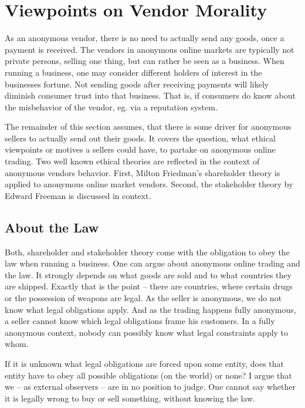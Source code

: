 \section{Viewpoints on Vendor Morality}
\label{vendors}

As an anonymous vendor, there is no need to actually send any goods, once a payment is received. The vendors in anonymous online markets are typically not private persons, selling one thing, but can rather be seen as a business\cite{silkroad2013}. When running a business, one may consider different holders of interest in the businesses fortune. Not sending goods after receiving payments will likely diminish consumer trust into that business. That is, if consumers do know about the misbehavior of the vendor, eg. via a reputation system.

The remainder of this section assumes, that there is some driver for anonymous sellers to actually send out their goods. It covers the question, what ethical viewpoints or motives a sellers could have, to partake on anonymous online trading. Two well known ethical theories are reflected in the context of anonymous vendors behavior. First, Milton Friedman's shareholder theory is applied to anonymous online market vendors. Second, the stakeholder theory by Edward Freeman is discussed in context.

\subsection{About the Law}

Both, shareholder and stakeholder theory come with the obligation to obey the law when running a business\cite{shareholder, stakeholder}. One can argue about anonymous online trading and the law. It strongly depends on what goods are sold and to what countries they are shipped. Exactly that is the point -- there are countries, where certain drugs or the possession of weapons are legal. As the seller is anonymous, we do not know what legal obligations apply. And as the trading happens fully anonymous, a seller cannot know which legal obligations frame his customers. In a fully anonymous context, nobody can possibly know what legal constraints apply to whom.

If it is unknown what legal obligations are forced upon some entity, does that entity have to obey all possible obligations (on the world) or none? I argue that we -- as external observers -- are in no position to judge. One cannot say whether it is legally wrong to buy or sell something, without knowing the law.

